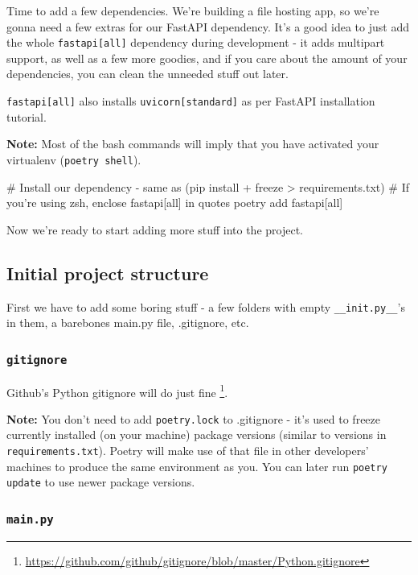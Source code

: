 \documentclass[14pt]{extarticle}
\newcommand{\flink}[1]{\footnote{\href{#1}{#1}}}
\newcommand{\note}{\textbf{\color{red}Note: }}
\newcommand{\bashinline}[1]{\lstinline[language=bash, style=cstyle, morekeywords={poetry, git, mv, python, uvicorn}, basicstyle=\ttfamily\normalsize]{#1}}
\begin{document}
Time to add a few dependencies. We're building a file hosting app, so we're gonna need a few extras for our FastAPI dependency. It's a good idea to just add the whole \texttt{fastapi[all]} dependency during development - it adds multipart support, as well as a few more goodies, and if you care about the amount of your dependencies, you can clean the unneeded stuff out later.

\texttt{fastapi[all]} also installs \texttt{uvicorn[standard]} as per FastAPI installation tutorial.

\note Most of the bash commands will imply that you have activated your virtualenv (\bashinline{poetry shell}).

\begin{bashcode}
    # Install our dependency - same as (pip install + freeze > requirements.txt)
    # If you're using zsh, enclose fastapi[all] in quotes
    poetry add fastapi[all]
\end{bashcode}

Now we're ready to start adding more stuff into the project.

\subsection{Initial project structure}

First we have to add some boring stuff - a few folders with empty \texttt{\_\_init.py\_\_}'s in them, a barebones main.py file, .gitignore, etc.

\subsubsection{\texttt{gitignore}}

Github's Python gitignore will do just fine \flink{https://github.com/github/gitignore/blob/master/Python.gitignore}.

\note You don't need to add \texttt{poetry.lock} to .gitignore - it's used to freeze currently installed (on your machine) package versions (similar to versions in \texttt{requirements.txt}). Poetry will make use of that file in other developers' machines to produce the same environment as you. You can later run \bashinline{poetry update} to use newer package versions.

\subsubsection{\texttt{main.py}}
\end{document}
